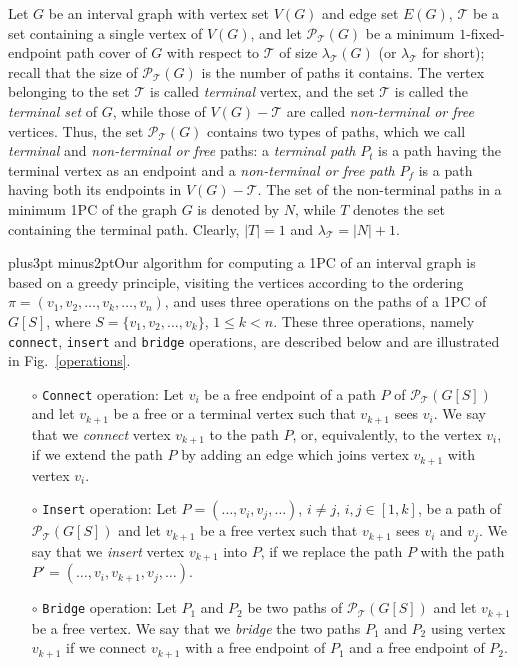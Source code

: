 \documentclass[10pt]{article}
\def\yskip{\penalty-50\vskip3pt plus3pt minus2pt}
\def\y{\yskip}
\begin{document}
Let $G$ be an interval graph with vertex set $V(G)$ and edge set
$E(G)$, $\mathcal{T}$ be a set containing a single vertex of
$V(G)$, and let $\mathcal{P_{\mathcal{T}}}(G)$ be a minimum
$1$-fixed-endpoint path cover of $G$ with respect to $\mathcal{T}$
of size $\lambda_\mathcal{T}(G)$ (or $\lambda_\mathcal{T}$ for
short); recall that the size of $\mathcal{P_{\mathcal{T}}}(G)$ is
the number of paths it contains. The vertex belonging to the set
$\mathcal{T}$ is called {\it terminal} vertex, and the set
$\mathcal{T}$ is called the {\it terminal set} of $G$, while those
of $V(G) - \mathcal{T}$ are called {\it non-terminal or free}
vertices. Thus, the set $\mathcal{P_{\mathcal{T}}}(G)$ contains
two types of paths, which we call {\it terminal} and {\it
non-terminal or free} paths: a {\it terminal path} $P_t$ is a path
having the terminal vertex as an endpoint and a {\it non-terminal
or free path} $P_f$ is a path having both its endpoints in $V(G) -
\mathcal{T}$. The set of the non-terminal paths in a minimum 1PC
of the graph $G$ is denoted by $N$, while $T$ denotes the set
containing the terminal path. Clearly, $|T|=1$ and
$\lambda_\mathcal{T}= |N| + 1$.

\y Our algorithm for computing a 1PC of an interval graph is based
on a greedy principle, visiting the vertices according to the
ordering $\pi=(v_1, v_2, \ldots, v_k, \ldots, v_n)$, and uses
three operations on the paths of a 1PC of $G[S]$, where $S=\{v_1,
v_2, \ldots, v_k\}$, $1 \leq k < n$. These three operations,
namely {\tt connect}, {\tt insert} and {\tt bridge} operations,
are described below and are illustrated in Fig.~\ref{operations}.

\begin{itemize}

\item [$\circ$]
{\tt Connect} operation: Let $v_i$ be a free endpoint of a path
$P$ of $\mathcal{P_{\mathcal{T}}}(G[S])$ and let $v_{k+1}$ be a
free or a terminal vertex such that $v_{k+1}$ sees $v_i$. We say
that we {\it connect} vertex $v_{k+1}$ to the path $P$, or,
equivalently, to the vertex $v_i$, if we extend the path $P$ by
adding an edge which joins vertex $v_{k+1}$ with vertex $v_i$.



\item [$\circ$] {\tt Insert} operation: Let $P=(\ldots, v_i, v_j, \ldots)$, $i \neq j$, $i,j \in [1,k]$, be a
path of $\mathcal{P_{\mathcal{T}}}(G[S])$ and let $v_{k+1}$ be a
free vertex such that $v_{k+1}$ sees $v_i$ and $v_j$. We say that
we {\it insert} vertex $v_{k+1}$ into $P$, if we replace the path
$P$ with the path $P'=(\ldots, v_i, v_{k+1}, v_j, \ldots)$.

\item [$\circ$] {\tt Bridge} operation: Let $P_1$ and $P_2$ be two
paths of $\mathcal{P_{\mathcal{T}}}(G[S])$ and let $v_{k+1}$ be a
free vertex. We say that we {\it bridge} the two paths $P_1$ and
$P_2$ using vertex $v_{k+1}$ if we connect $v_{k+1}$ with a free
endpoint of $P_1$ and a free endpoint of $P_2$.

\end{itemize}
\end{document}
